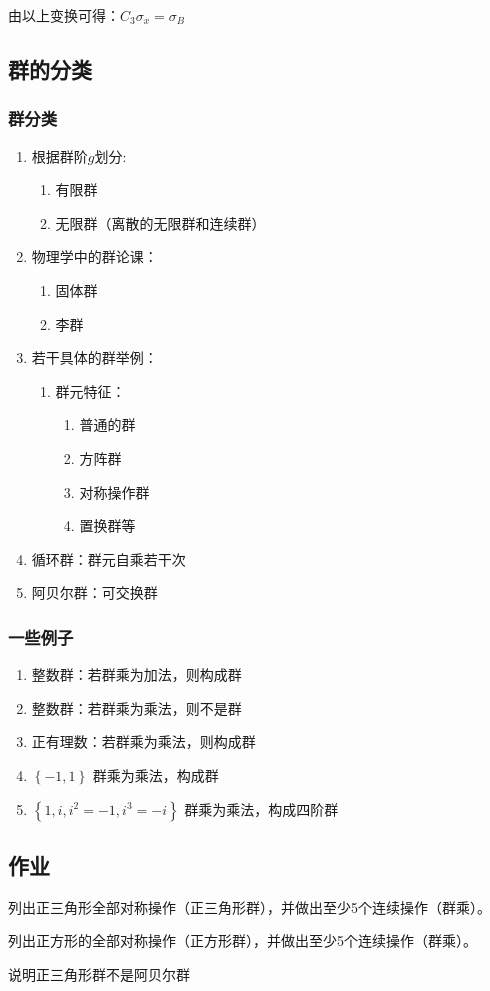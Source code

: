 \documentclass[math=mtpro2,lang=cn,color=green,device=pad]{elegantbook}
\begin{document}
\begin{note}
由以上变换可得：$C_3\sigma_x =\sigma_B$
\end{note}

\subsection{群的分类}

\subsubsection{群分类}

\begin{enumerate}
   \item 根据群阶$g$划分:
      \begin{enumerate}
	 \item 有限群
	 \item 无限群（离散的无限群和连续群）
      \end{enumerate}
   \item 物理学中的群论课：
      \begin{enumerate}
	 \item 固体群
	 \item 李群
      \end{enumerate}
   \item 若干具体的群举例：
      \begin{enumerate}
	 \item 群元特征：
	    \begin{enumerate}
	       \item 普通的群
	       \item 方阵群
	       \item 对称操作群
	       \item 置换群等
	    \end{enumerate}
      \end{enumerate}
   \item 循环群：群元自乘若干次
   \item 阿贝尔群：可交换群
\end{enumerate}

\subsubsection{一些例子}

\begin{enumerate}
   \item 整数群：若群乘为加法，则构成群
   \item 整数群：若群乘为乘法，则不是群
   \item 正有理数：若群乘为乘法，则构成群
   \item $\left\{ -1,1 \right\}$ 群乘为乘法，构成群
   \item $\left\{ 1,i,i^2=-1,i^3=-i \right\}$ 群乘为乘法，构成四阶群
\end{enumerate}

\subsection{作业}
\begin{exercise}
   列出正三角形全部对称操作（正三角形群），并做出至少5个连续操作（群乘）。
\end{exercise}
\begin{exercise}
   列出正方形的全部对称操作（正方形群），并做出至少5个连续操作（群乘）。
\end{exercise}
\begin{exercise}
   说明正三角形群不是阿贝尔群
\end{exercise}
\end{document}
